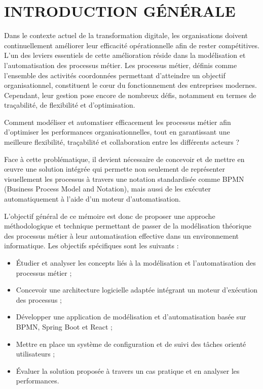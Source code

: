 
\chapter{INTRODUCTION GÉNÉRALE}
\label{ch:introduction_generale}


Dans le contexte actuel de la transformation digitale, les organisations doivent continuellement améliorer leur efficacité opérationnelle afin de rester compétitives. L’un des leviers essentiels de cette amélioration réside dans la modélisation et l’automatisation des processus métier. Les processus métier, définis comme l’ensemble des activités coordonnées permettant d’atteindre un objectif organisationnel, constituent le cœur du fonctionnement des entreprises modernes. Cependant, leur gestion pose encore de nombreux défis, notamment en termes de traçabilité, de flexibilité et d’optimisation.

Comment modéliser et automatiser efficacement les processus métier afin d’optimiser les performances organisationnelles, tout en garantissant une meilleure flexibilité, traçabilité et collaboration entre les différents acteurs ?  

Face à cette problématique, il devient nécessaire de concevoir et de mettre en œuvre une solution intégrée qui permette non seulement de représenter visuellement les processus à travers une notation standardisée comme BPMN (Business Process Model and Notation), mais aussi de les exécuter automatiquement à l’aide d’un moteur d’automatisation.  

L’objectif général de ce mémoire est donc de proposer une approche méthodologique et technique permettant de passer de la modélisation théorique des processus métier à leur automatisation effective dans un environnement informatique. Les objectifs spécifiques sont les suivants :
\begin{itemize}
    \item Étudier et analyser les concepts liés à la modélisation et l’automatisation des processus métier ;
    \item Concevoir une architecture logicielle adaptée intégrant un moteur d’exécution des processus ;
    \item Développer une application de modélisation et d’automatisation basée sur BPMN, Spring Boot et React ;
    \item Mettre en place un système de configuration et de suivi des tâches orienté utilisateurs ;
    \item Évaluer la solution proposée à travers un cas pratique et en analyser les performances.
\end{itemize}

